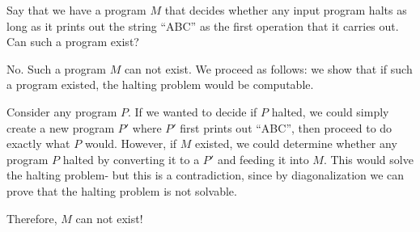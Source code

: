 \question Say that we have a program $M$ that decides whether any input 
program halts as long as it prints out the string “ABC” as the first 
operation that it carries out. Can such a program exist? 

 
 

 
 
\begin{solution} [1 in]
No. Such a program $M$ can not exist. We proceed as follows: we show 
that if such a program existed, the halting problem would be computable.

Consider any program $P$. If we wanted to decide if $P$ halted, we 
could simply create a new program $P'$ where $P'$ first prints out “ABC”, 
then proceed to do exactly what $P$ would. However, if $M$ existed, we 
could determine whether any program $P$ halted by converting it to a $P'$ 
and feeding it into $M$. This would solve the halting problem- but this 
is a contradiction, since by diagonalization we can prove that the 
halting problem is not solvable.

Therefore, $M$ can not exist!  
\end{solution}